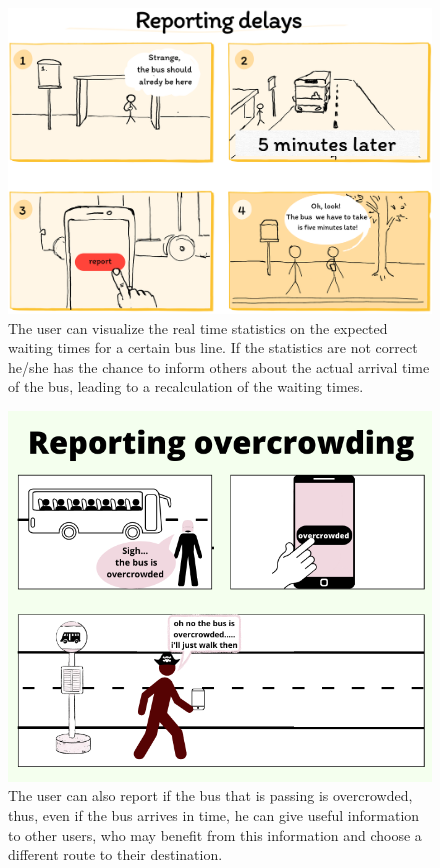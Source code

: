 \documentclass[a4paper, 11pt]{report}
\begin{document}
\vspace{2cm}
\begin{figure}[H]
	\centering
	\includegraphics[width=.9\textwidth]{img/storyboards/storyboard_reporting_delays.png}%
	\caption{The user can visualize the real time statistics on the expected waiting times for a certain bus line.
		If the statistics are not correct he/she has the chance to inform others about the actual arrival
		time of the bus, leading to a recalculation of the waiting times.}\label{fig:b}
\end{figure}
\newpage%


\vspace{2cm}
\begin{figure}[H]
	\centering
	\includegraphics[width=.9\textwidth]{img/storyboards/storyboard_overcrowding.png}
	\caption{The user can also report if the bus that is passing is overcrowded,
		thus, even if the bus arrives in time, he can give useful information to other users,
		who may benefit from this information and choose a different route to their destination.}\label{fig:c}
\end{figure}
\newpage%
\end{document}
